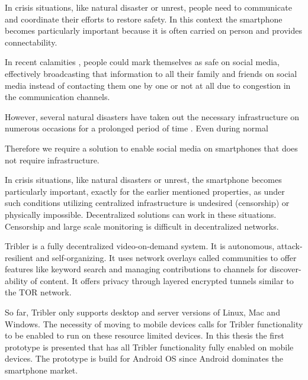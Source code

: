 In crisis situations, like natural disaster or unrest, people need to communicate and coordinate their efforts to restore safety.
In this context the smartphone becomes particularly important because it is often carried on person and provides connectability.

In recent calamities \cite{earthquake-nepal, etc...}, people could mark themselves as safe on social media, effectively broadcasting that information to all their family and friends on social media instead of contacting them one by one or not at all due to congestion in the communication channels.

However, several natural disasters have taken out the necessary infrastructure on numerous occasions for a prolonged period of time \cite{renesys2005katrina}.
Even during normal 

Therefore we require a solution to enable social media on smartphones that does not require infrastructure. %



In crisis situations, like natural disasters or unrest, the smartphone becomes particularly important, exactly for the earlier mentioned properties, as under such conditions utilizing centralized infrastructure is undesired (censorship) or physically impossible.
Decentralized solutions can work in these situations.
Censorship and large scale monitoring is difficult in decentralized networks.
\cite{pouwelse2012censorshipfree}










Tribler is a fully decentralized video-on-demand system. \cite{TriblerOverviewJournal, tribler2014play, tribler-anon-hd}
It is autonomous, attack-resilient and self-organizing. \cite{votecast, tribler-gossip}
It uses network overlays called communities to offer features like keyword search and managing contributions to channels for discover-ability of content.
It offers privacy through layered encrypted tunnels similar to the TOR network.\cite{tribler2014at3, dingledine2004tor, dingledine2006design}

So far, Tribler only supports desktop and server versions of Linux, Mac and Windows.
The necessity of moving to mobile devices calls for Tribler functionality to be enabled to run on these resource limited devices.
In this thesis the first prototype is presented that has all Tribler functionality fully enabled on mobile devices.
The prototype is build for Android OS since Android dominates the smartphone market.






